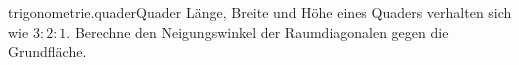 \begin{exercise}{trigonometrie.quader}{Quader}
  \ifproblem\problem
    Länge, Breite und Höhe eines Quaders verhalten sich wie $3:2:1$.
    Berechne den Neigungswinkel der Raumdiagonalen gegen die Grundfläche.
  \fi
\end{exercise}
